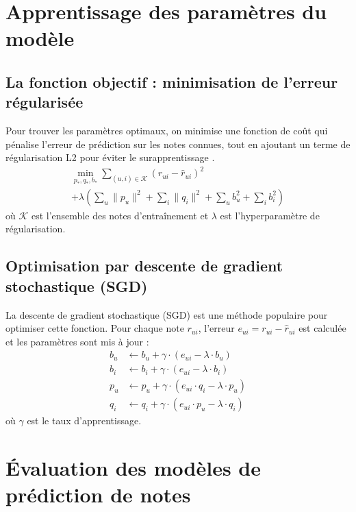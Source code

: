 \section{Apprentissage des paramètres du modèle}

\subsection{La fonction objectif : minimisation de l'erreur régularisée}
Pour trouver les paramètres optimaux, on minimise une fonction de coût qui pénalise l'erreur de prédiction sur les notes connues, tout en ajoutant un terme de régularisation L2 pour éviter le surapprentissage \citep{Koren2009}.
\begin{equation}
\label{eq:cost_annexe}
\begin{split}
\min_{p_*, q_*, b_*} \sum_{(u,i) \in \mathcal{K}} (r_{ui} - \hat{r}_{ui})^2 \\
+ \lambda \left( \sum_u \|p_u\|^2 + \sum_i \|q_i\|^2 + \sum_u b_u^2 + \sum_i b_i^2 \right)
\end{split}
\end{equation}
où $\mathcal{K}$ est l'ensemble des notes d'entraînement et $\lambda$ est l'hyperparamètre de régularisation.

\subsection{Optimisation par descente de gradient stochastique (SGD)}
La descente de gradient stochastique (SGD) est une méthode populaire pour optimiser cette fonction. Pour chaque note $r_{ui}$, l'erreur $e_{ui} = r_{ui} - \hat{r}_{ui}$ est calculée et les paramètres sont mis à jour :
\begin{align}
b_u &\leftarrow b_u + \gamma \cdot (e_{ui} - \lambda \cdot b_u) \label{eq:sgd_bu_annexe} \\
b_i &\leftarrow b_i + \gamma \cdot (e_{ui} - \lambda \cdot b_i) \label{eq:sgd_bi_annexe} \\
p_u &\leftarrow p_u + \gamma \cdot (e_{ui} \cdot q_i - \lambda \cdot p_u) \label{eq:sgd_pu_annexe} \\
q_i &\leftarrow q_i + \gamma \cdot (e_{ui} \cdot p_u - \lambda \cdot q_i) \label{eq:sgd_qi_annexe}
\end{align}
où $\gamma$ est le taux d'apprentissage.

\section{Évaluation des modèles de prédiction de notes}

